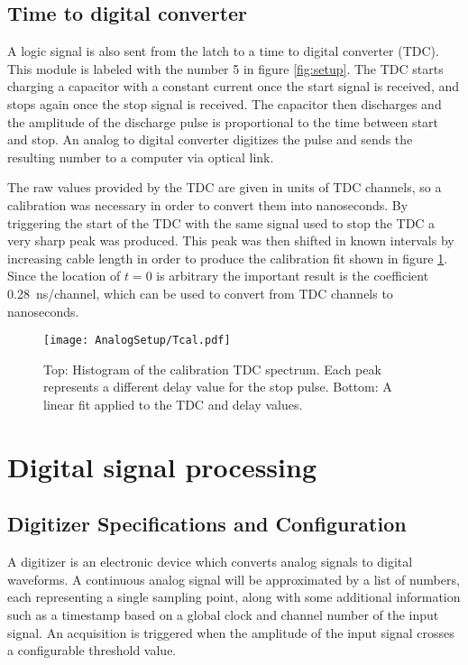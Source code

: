 \documentclass[main.tex]{subfiles}
\begin{document}
\subsection{Time to digital converter}
A logic signal is also sent from the latch to a time to digital converter (TDC). This module is labeled with the number 5 in figure \ref{fig:setup}. The TDC starts charging a capacitor with a constant current once the start signal is received, and stops again once the stop signal is received. The capacitor then discharges and the amplitude of the discharge pulse is proportional to the time between start and stop\cite{CAENTDC}. An analog to digital converter digitizes the pulse and sends the resulting number to a computer via optical link.

The raw values provided by the TDC are given in units of TDC channels, so a calibration was necessary in order to convert them into nanoseconds. By triggering the start of the TDC with the same signal used to stop the TDC a very sharp peak was produced. This peak was then shifted in known intervals by increasing cable length in order to produce the calibration fit shown in figure \ref{fig:Tcal}. Since the location of $t=0$ is arbitrary the important result is the coefficient \SI{0.28}{\nano\second/channel}, which can be used to convert from TDC channels to nanoseconds.
\begin{figure}[ht]
	\centering
    	\texttt{[image: AnalogSetup/Tcal.pdf]}
        \caption[TDC calibration of analog setup]{Top: Histogram of the calibration TDC spectrum. Each peak represents a different delay value for the stop pulse. Bottom: A linear fit applied to the TDC and delay values.}
	    \label{fig:Tcal} 
\end{figure}

\section{Digital signal processing}
\subsection{Digitizer Specifications and Configuration}
A digitizer is an electronic device which converts analog signals to digital waveforms. A continuous analog signal will be approximated by a list of numbers, each representing a single sampling point, along with some additional information such as a timestamp based on a global clock and channel number of the input signal. An acquisition is triggered when the amplitude of the input signal crosses a configurable threshold value.
\end{document}
